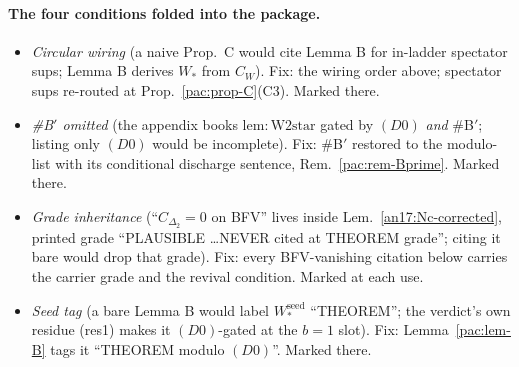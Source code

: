 \paragraph{The four conditions folded into the package.}
\begin{itemize}[leftmargin=*,nosep]
\item[\textup{W1}] \emph{Circular wiring} (a naive Prop.\ C would cite Lemma
  B for in-ladder spectator sups; Lemma B derives $W_*$ from $C_W$).
  Fix: the wiring order above; spectator sups re-routed at
  Prop.~\ref{pac:prop-C}(C3). Marked there.
\item[\textup{W2}] \emph{\#B$'$ omitted} (the appendix books
  $\mathrm{lem:W2star}$ gated by $(D0)$ \emph{and} \#B$'$; listing only $(D0)$ would be incomplete). Fix: \#B$'$
  restored to the modulo-list with its conditional discharge sentence,
  Rem.~\ref{pac:rem-Bprime}. Marked there.
\item[\textup{W3}] \emph{Grade inheritance} (``$C_{\Delta_2}=0$ on
  BFV'' lives inside Lem.~\ref{an17:Nc-corrected}, printed grade ``PLAUSIBLE
  \dots NEVER cited at THEOREM grade''; citing it bare
  would drop that grade). Fix: every BFV-vanishing citation below carries the
  carrier grade and the revival condition. Marked at each use.
\item[\textup{W4}] \emph{Seed tag} (a bare Lemma B would label
  $W_*^{\mathrm{seed}}$ ``THEOREM''; the verdict's own residue (res1)
  makes it $(D0)$-gated at the $b{=}1$ slot). Fix:
  Lemma~\ref{pac:lem-B} tags it ``THEOREM modulo $(D0)$''. Marked
  there.
\end{itemize}

